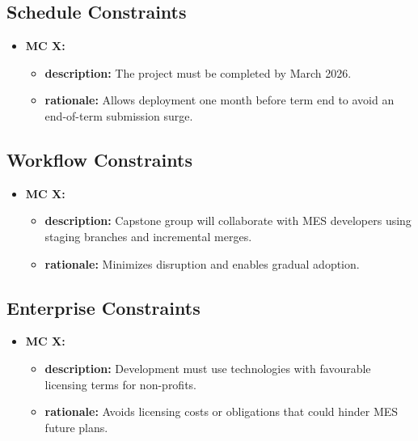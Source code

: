 \documentclass[12pt]{article}
\begin{document}
\subsection{Schedule Constraints}
  \begin{itemize}
    \item \textbf{MC X:}
      \begin{itemize}[label=$\circ$]
        \item \textbf{description:} The project must be completed by March 2026.
        \item \textbf{rationale:} Allows deployment one month before term end to avoid an end-of-term submission surge.
      \end{itemize}
  \end{itemize}

\subsection{Workflow Constraints}
  \begin{itemize}
    \item \textbf{MC X:}
      \begin{itemize}[label=$\circ$]
        \item \textbf{description:} Capstone group will collaborate with MES developers using staging branches and incremental merges.
        \item \textbf{rationale:} Minimizes disruption and enables gradual adoption.
      \end{itemize}
  \end{itemize}

\subsection{Enterprise Constraints}
  \begin{itemize}
    \item \textbf{MC X:}
      \begin{itemize}[label=$\circ$]
        \item \textbf{description:} Development must use technologies with favourable licensing terms for non-profits.
        \item \textbf{rationale:} Avoids licensing costs or obligations that could hinder MES future plans.
      \end{itemize}
  \end{itemize}


\end{document}
